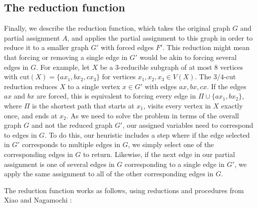 \subsection{The reduction function}
\label{sec:reduction}

Finally, we describe the reduction function, which takes the original graph $G$ and partial assignment $A$, and applies the partial assignment to this graph in order to reduce it to a smaller graph $G'$ with forced edges $F'$. This reduction might mean that forcing or removing a single edge in $G'$ would be akin to forcing several edges in $G$. For example, let $X$ be a $3$-reducible subgraph of at most $8$ vertices with $\text{cut}(X) = \{ax_1, bx_2, cx_3\}$ for vertices $x_1, x_2, x_3 \in V(X)$. The $3/4$-cut reduction reduces $X$ to a single vertex $x \in G'$ with edges $ax, bx, cx$. If the edges $ax$ and $bx$ are forced, this is equivalent to forcing every edge in $\Pi \cup \{ax_1, bx_2\}$, where $\Pi$ is the shortest path that starts at $x_1$, visits every vertex in $X$ exactly once, and ends at $x_2$. As we need to solve the problem in terms of the overall graph $G$ and not the reduced graph $G'$, our assigned variables need to correspond to edges in $G$. To do this, our heuristic includes a step where if the edge selected in $G'$ corresponds to multiple edges in $G$, we simply select one of the corresponding edges in $G$ to return. Likewise, if the next edge in our partial assignment is one of several edges in $G$ corresponding to a single edge in $G'$, we apply the same assignment to all of the other corresponding edges in $G$.

The reduction function works as follows, using reductions and procedures from Xiao and Nagamochi \cite{xiao2016degree3}:

